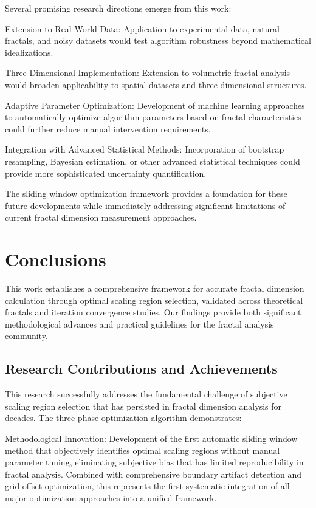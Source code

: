 \documentclass[preprint,12pt]{elsarticle}
\def\textbf#1{#1}%
\begin{document}
Several promising research directions emerge from this work:

\textbf{Extension to Real-World Data}: Application to experimental data, natural fractals, and noisy datasets would test algorithm robustness beyond mathematical idealizations.

\textbf{Three-Dimensional Implementation}: Extension to volumetric fractal analysis would broaden applicability to spatial datasets and three-dimensional structures.

\textbf{Adaptive Parameter Optimization}: Development of machine learning approaches to automatically optimize algorithm parameters based on fractal characteristics could further reduce manual intervention requirements.

\textbf{Integration with Advanced Statistical Methods}: Incorporation of bootstrap resampling, Bayesian estimation, or other advanced statistical techniques could provide more sophisticated uncertainty quantification.



The sliding window optimization framework provides a foundation for these future developments while immediately addressing significant limitations of current fractal dimension measurement approaches.

\section{Conclusions}
\label{sec:conclusions}

This work establishes a comprehensive framework for accurate fractal dimension calculation through optimal scaling region selection, validated across theoretical fractals and iteration convergence studies. Our findings provide both significant methodological advances and practical guidelines for the fractal analysis community.

\subsection{Research Contributions and Achievements}

This research successfully addresses the fundamental challenge of subjective scaling region selection that has persisted in fractal dimension analysis for decades. The three-phase optimization algorithm demonstrates:

\textbf{Methodological Innovation}: Development of the first automatic sliding window method that objectively identifies optimal scaling regions without manual parameter tuning, eliminating subjective bias that has limited reproducibility in fractal analysis. Combined with comprehensive boundary artifact detection and grid offset optimization, this represents the first systematic integration of all major optimization approaches into a unified framework.
\end{document}
